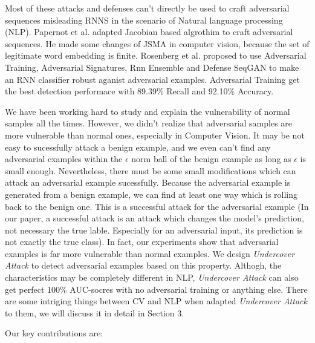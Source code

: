 \documentclass{article}
\begin{document}
Most of these attacks and defenses can't directly be used to craft adversarial sequences misleading RNNS in the scenario of Natural language processing (NLP). Papernot et al. \cite{papernot2016crafting} adapted Jacobian based algrothim to craft adversarial sequences. He made some changes of JSMA in computer vision, because the set of legitimate word embedding is finite. Rosenberg et al. proposed to use Adversarial Training, Adversarial Signatures, Rnn Ensemble and Defense SeqGAN to make an RNN classifier robust aganist adversarial examples. Adversarial Training get the best detection performace with 89.39\% Recall and 92.10\% Accuracy.

We have been working hard to study and explain the vulnerability of normal samples all the times. However, we didn't realize that adversarial samples are more vulnerable than normal ones, especially in Computer Vision. It may be not easy to sucessfully attack a benign example, and we even can't find any adversarial examples within the $\epsilon$ norm ball of the benign example as long as $\epsilon$ is small enough. Nevertheless, there must be some small modifications which can attack an adversarial example sucessfully. Because the adversarial example is generated from a benign example, we can find at least one way which is rolling back to the benign one. This is a successful attack for the adversarial example (In our paper, a successful attack is an attack which changes the model's prediction, not necessary the true lable. Especially for an adversarial input, its prediction is not exactly the true class). In fact, our experiments show that adversarial examples is far more vulnerable than normal examples. We design \emph{Undercover Attack} to detect adversarial examples based on this property. Althogh, the characteristics may be completely different in NLP, \emph{Undercover Attack} can also get perfect 100\% AUC-socres with no adversarial training or anything else. There are some intriging things between CV and NLP when adapted \emph{Undercover Attack} to them, we will discuss it in detail in Section 3.

Our key contributions are:
\end{document}
